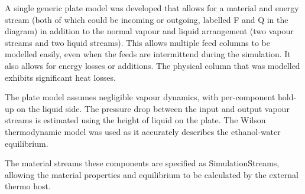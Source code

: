 A single generic plate model was developed that allows for a material and energy stream (both of which could be incoming or outgoing, labelled F and Q in the diagram) in addition to the normal vapour and liquid arrangement (two vapour streams and two liquid streams).  
This allows multiple feed columns to be modelled easily, even when the feeds are intermittend during the simulation.  
It also allows for energy losses or additions.  
The physical column that was modelled exhibits significant heat losses.

The plate model assumes negligible vapour dynamics, with per-component hold-up on the liquid side.  
The pressure drop between the input and output vapour streams is estimated using the height of liquid on the plate.  
The Wilson thermodynamic model was used as it accurately describes the ethanol-water equilibrium. 

The material streams these components are specified as SimulationStreams, allowing the material properties and equilibrium to be calculated by the external thermo host.


